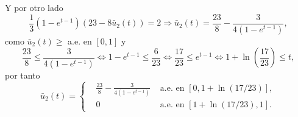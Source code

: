 Y por otro lado
\begin{equation*}
    \frac{1}{3} (1 - e^{t - 1}) (23 - 8 \bar{u}_2 (t)) = 2
    \Rightarrow \bar{u}_2 (t) = \frac{23}{8} - \frac{3}{4 (1 - e^{t - 1})},
\end{equation*}
como $\bar{u}_2(t) \geq$ a.e. en $[0,1]$ y
\begin{equation*}
    \frac{23}{8} \leq \frac{3}{4 (1 - e^{t - 1})}
    \Leftrightarrow 1 - e^{t - 1} \leq \frac{6}{23}
    \Leftrightarrow \frac{17}{23} \leq e^{t-1}
    \Leftrightarrow 1 + \ln \left(\frac{17}{23}\right) \leq t,
\end{equation*}
por tanto
\begin{equation*}
    \bar{u}_2 (t) = \left\{
    \begin{aligned}
        & \frac{23}{8} - \frac{3}{4 (1 - e^{t - 1})} & \text{ a.e. en } [0, 1 + \ln(17/23)], \\
        & 0  & \text{ a.e. en } [1 + \ln(17/23), 1].
    \end{aligned}
    \right.
\end{equation*}

